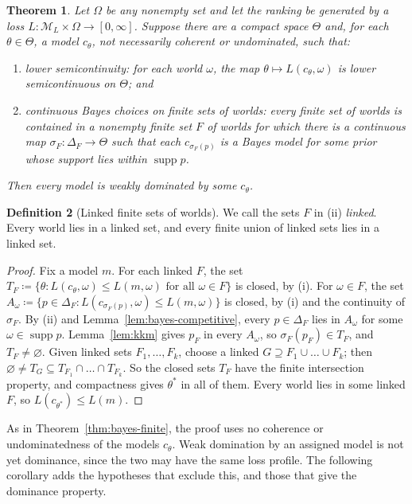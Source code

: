\documentclass[11pt]{article}
\newtheorem{theorem}{Theorem}[section]
\theoremstyle{definition}
\newtheorem{definition}[theorem]{Definition}
\theoremstyle{remark}
\newcommand{\M}{\mathcal M}
\newcommand{\supp}{\operatorname{supp}}
\begin{document}
\begin{theorem}\label{thm:bayes-infinite}
Let $\Omega$ be any nonempty set and let the ranking be generated by a loss $L:\M_L\times\Omega\to[0,\infty]$. Suppose there are a compact space $\Theta$ and, for each $\theta\in\Theta$, a model $c_\theta$, not necessarily coherent or undominated, such that:
\begin{enumerate}[label=(\roman*)]
\item \emph{lower semicontinuity}: for each world $\omega$, the map $\theta\mapsto L(c_\theta,\omega)$ is lower semicontinuous on $\Theta$; and
\item \emph{continuous Bayes choices on finite sets of worlds}: every finite set of worlds is contained in a nonempty finite set $F$ of worlds for which there is a continuous map $\sigma_F:\Delta_F\to\Theta$ such that each $c_{\sigma_F(p)}$ is a Bayes model for some prior whose support lies within $\supp p$.
\end{enumerate}
Then every model is weakly dominated by some $c_\theta$.
\end{theorem}
\begin{definition}[Linked finite sets of worlds]\label{def:linked}
We call the sets $F$ in (ii) \emph{linked}. Every world lies in a linked set, and every finite union of linked sets lies in a linked set.
\end{definition}

\begin{proof}
Fix a model $m$. For each linked $F$, the set $T_F\coloneqq\{\theta:L(c_\theta,\omega)\le L(m,\omega)\text{ for all }\omega\in F\}$ is closed, by (i). For $\omega\in F$, the set $A_\omega\coloneqq\{p\in\Delta_F:L(c_{\sigma_F(p)},\omega)\le L(m,\omega)\}$ is closed, by (i) and the continuity of $\sigma_F$. By (ii) and Lemma~\ref{lem:bayes-competitive}, every $p\in\Delta_F$ lies in $A_\omega$ for some $\omega\in\supp p$. Lemma~\ref{lem:kkm} gives $p_F$ in every $A_\omega$, so $\sigma_F(p_F)\in T_F$, and $T_F\ne\varnothing$. Given linked sets $F_1,\dots,F_k$, choose a linked $G\supseteq F_1\cup\dots\cup F_k$; then $\varnothing\ne T_G\subseteq T_{F_1}\cap\dots\cap T_{F_k}$. So the closed sets $T_F$ have the finite intersection property, and compactness gives $\theta^*$ in all of them. Every world lies in some linked $F$, so $L(c_{\theta^*})\le L(m)$.
\end{proof}

As in Theorem~\ref{thm:bayes-finite}, the proof uses no coherence or undominatedness of the models $c_\theta$. Weak domination by an assigned model is not yet dominance, since the two may have the same loss profile. The following corollary adds the hypotheses that exclude this, and those that give the dominance property.
\end{document}
